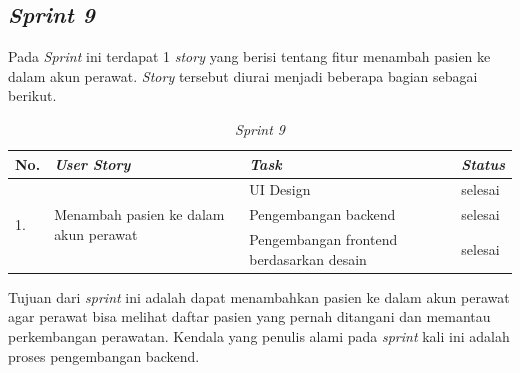 \subsection{\textit{Sprint 9}}
Pada \textit{Sprint} ini terdapat 1 \textit{story} yang berisi tentang fitur menambah pasien ke dalam akun perawat. \textit{Story} tersebut diurai menjadi beberapa bagian sebagai berikut.
	\begin{table}[H]
	\caption{\textit{Sprint 9}}
	\label{sprint9_backlog}
	\begin{tabular}{@{} |p{0.5cm}|p{5cm}|p{5cm}|p{2cm}| @{}}
		\hline
		\textbf{No.} & \textbf{\textit{User Story}} & \textbf{\textit{Task}} & \textbf{\textit{Status}} \\
		\hline
		\multirow{3}{3cm}{1.} & \multirow{3}{5cm}{Menambah pasien ke dalam akun perawat} & UI Design & selesai\\
		\cline{3-4}
		 & & Pengembangan backend & selesai\\
		\cline{3-4}
		& & Pengembangan frontend berdasarkan desain & selesai\\
		\cline{3-4}
		\hline
	\end{tabular}
	\end{table}
Tujuan dari \textit{sprint} ini adalah dapat menambahkan pasien ke dalam akun perawat agar perawat bisa melihat daftar pasien yang pernah ditangani dan memantau perkembangan perawatan. Kendala yang penulis alami pada \textit{sprint} kali ini adalah proses pengembangan backend.
